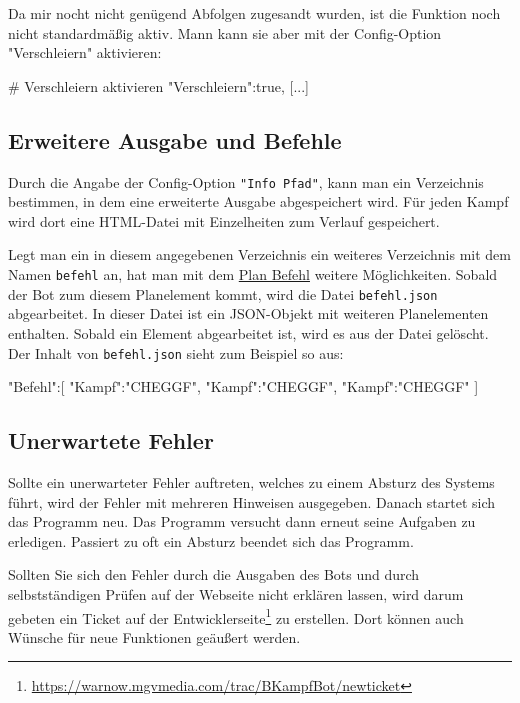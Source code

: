\documentclass{scrartcl}
\begin{document}
Da mir nocht nicht genügend Abfolgen zugesandt wurden, ist die Funktion noch
nicht standardmäßig aktiv. Mann kann sie aber mit der Config-Option
"Verschleiern" aktivieren:

\begin{code}[language=bash]
[...]
# Verschleiern aktivieren
"Verschleiern":true,
[...]
\end{code}

\subsection{Erweitere Ausgabe und Befehle}
\label{Infopfad}

Durch die Angabe der Config-Option \texttt{"Info Pfad"}, kann man ein Verzeichnis bestimmen, in dem eine erweiterte Ausgabe abgespeichert wird. Für jeden Kampf wird dort eine HTML-Datei mit Einzelheiten zum Verlauf gespeichert. 

Legt man ein in diesem angegebenen Verzeichnis ein weiteres Verzeichnis mit dem Namen \texttt{befehl} an, hat man mit dem \hyperref[PlanBefehl]{Plan Befehl} weitere Möglichkeiten. Sobald der Bot zum diesem Planelement kommt, wird die Datei \texttt{befehl.json} abgearbeitet. In dieser Datei ist ein JSON-Objekt mit weiteren Planelementen enthalten. Sobald ein Element abgearbeitet ist, wird es aus der Datei gelöscht. Der Inhalt von \texttt{befehl.json} sieht zum Beispiel so aus:

\begin{code}[language=bash]
{
	"Befehl":[
		{"Kampf":"CHEGGF"},
		{"Kampf":"CHEGGF"},
		{"Kampf":"CHEGGF"}
	]
}
\end{code}

\subsection{Unerwartete Fehler}
Sollte ein unerwarteter Fehler auftreten, welches zu einem Absturz des Systems führt, wird der Fehler mit mehreren Hinweisen ausgegeben. Danach startet sich das Programm neu. Das Programm versucht dann erneut seine Aufgaben zu erledigen. Passiert zu oft ein Absturz beendet sich das Programm.

Sollten Sie sich den Fehler durch die Ausgaben des Bots und durch selbstständigen Prüfen auf der Webseite nicht erklären lassen, wird darum gebeten ein Ticket auf der Entwicklerseite\footnote{\url{https://warnow.mgvmedia.com/trac/BKampfBot/newticket}} zu erstellen. Dort können auch Wünsche für neue Funktionen geäußert werden.
\end{document}

